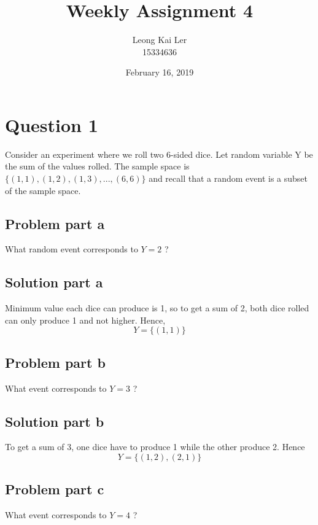 \documentclass[12pt]{article}%
\makeatletter
\renewcommand{\maketitle}{\bgroup\setlength{\parindent}{0pt}
\begin{flushleft}
  \textbf{\@title}

  \@author
  \@date
\end{flushleft}\egroup
}
\makeatother
\begin{document}
\title{Weekly Assignment 4}
\author{Leong Kai Ler \\ 15334636 \\   }
\date{February 16, 2019}
\maketitle

\section*{Question 1}
Consider an experiment where we roll two 6-sided dice. Let random variable Y be the sum of the values rolled. The sample space is $\{(1, 1), (1, 2), (1, 3), . . . , (6, 6)\}$ and recall that a random event is a subset of the sample space.
\subsection*{Problem part a}
What random event corresponds to $Y = 2$ ?
\subsection*{Solution part a}
Minimum value each dice can produce is 1, so to get a sum of 2, both dice rolled can only produce 1 and not higher. Hence, \\
\begin{equation*}
Y = \{(1,1)\}
\end{equation*}
\subsection*{Problem part b}
What event corresponds to $Y = 3$ ?
\subsection*{Solution part b}
To get a sum of 3, one dice have to produce 1 while the other produce 2. Hence \\ 
\begin{equation*}
Y = \{(1,2), (2,1)\}
\end{equation*}
\subsection*{Problem part c}
What event corresponds to $Y = 4$ ?
\end{document}
